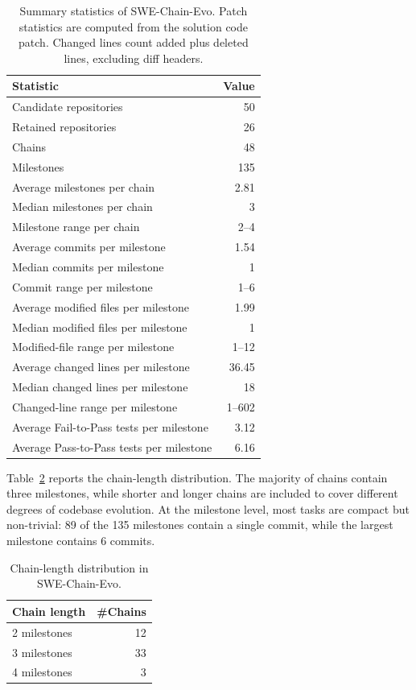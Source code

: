 \documentclass{article}
\begin{document}
\begin{table}[t]
\centering
\small
\begin{tabular}{lr}
\toprule
Statistic & Value \\
\midrule
Candidate repositories & 50 \\
Retained repositories & 26 \\
Chains & 48 \\
Milestones & 135 \\
Average milestones per chain & 2.81 \\
Median milestones per chain & 3 \\
Milestone range per chain & 2--4 \\
Average commits per milestone & 1.54 \\
Median commits per milestone & 1 \\
Commit range per milestone & 1--6 \\
Average modified files per milestone & 1.99 \\
Median modified files per milestone & 1 \\
Modified-file range per milestone & 1--12 \\
Average changed lines per milestone & 36.45 \\
Median changed lines per milestone & 18 \\
Changed-line range per milestone & 1--602 \\
Average Fail-to-Pass tests per milestone & 3.12 \\
Average Pass-to-Pass tests per milestone & 6.16 \\
\bottomrule
\end{tabular}
\caption{Summary statistics of SWE-Chain-Evo. Patch statistics are computed from the solution code patch. Changed lines count added plus deleted lines, excluding diff headers.}
\label{tab:swe_chain_overall_stats}
\end{table}

Table~\ref{tab:swe_chain_length_stats} reports the chain-length distribution. The majority of chains contain three milestones, while shorter and longer chains are included to cover different degrees of codebase evolution. At the milestone level, most tasks are compact but non-trivial: 89 of the 135 milestones contain a single commit, while the largest milestone contains 6 commits.

\begin{table}[t]
\centering
\small
\begin{tabular}{lr}
\toprule
Chain length & \#Chains \\
\midrule
2 milestones & 12 \\
3 milestones & 33 \\
4 milestones & 3 \\
\bottomrule
\end{tabular}
\caption{Chain-length distribution in SWE-Chain-Evo.}
\label{tab:swe_chain_length_stats}
\end{table}
\end{document}
